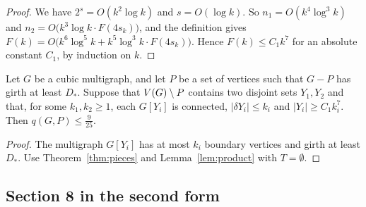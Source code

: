 \documentclass[11pt]{article}
\begin{document}
\begin{proof}
 We have $2^{s}=O(k^{2}\log k)$ and $s=O(\log k)$. So $n_1=O(k^{4}\log^{3}k)$
and $n_2=O\bigl(k^{3}\log k\cdot F(4s_k)\bigr)$, and the definition gives
$F(k)=O\bigl(k^{6}\log^{5}k+k^{5}\log^{3}k\cdot F(4s_k)\bigr)$. Hence $F(k)\le C_1k^{7}$ for an
absolute constant $C_1$, by induction on $k$.
\end{proof}

\begin{corollary}\label{cor:two}
Let $G$ be a cubic multigraph, and let $P$ be a set of vertices such that $G-P$ has girth at least
$D_*$. Suppose that $V(G)\setminus P$ contains two disjoint sets $Y_1,Y_2$ and that, for some
$k_1,k_2\ge1$, each $G[Y_i]$ is connected, $|\delta Y_i|\le k_i$ and $|Y_i|\ge C_1k_i^{7}$. Then
$q(G,P)\le\frac9{25}$.
\end{corollary}

\begin{proof}
The multigraph $G[Y_i]$ has at most $k_i$ boundary vertices and girth at least $D_*$. Use
Theorem~\ref{thm:pieces} and Lemma~\ref{lem:product} with $T=\emptyset$.
\end{proof}

\subsection{Section 8 in the second form}\label{sec:secondform}
\end{document}
